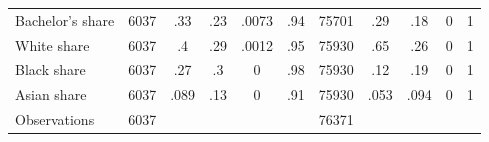 {\begin{tabular}{l*{2}{ccccc}}
Bachelor's share    &        6037&         .33&         .23&       .0073&         .94&       75701&         .29&         .18&           0&           1\\
White share         &        6037&          .4&         .29&       .0012&         .95&       75930&         .65&         .26&           0&           1\\
Black share         &        6037&         .27&          .3&           0&         .98&       75930&         .12&         .19&           0&           1\\
Asian share         &        6037&        .089&         .13&           0&         .91&       75930&        .053&        .094&           0&           1\\
\midrule
Observations        &        6037&            &            &            &            &       76371&            &            &            &            \\
\bottomrule
\end{tabular}
}
